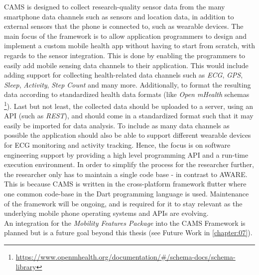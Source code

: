 CAMS is designed to collect research-quality sensor data from the many smartphone data channels such as sensors and location data, in addition to external sensors that the phone is connected to, such as wearable devices. The main focus of the framework is to allow application programmers to design and implement a custom mobile health app without having to start from scratch, with regards to the sensor integration. This is done by enabling the programmers to easily add mobile sensing data channels to their application. This would include adding support for collecting health-related data channels such as \textit{ECG}, \textit{GPS}, \textit{Sleep}, \textit{Activity}, \textit{Step Count} and many more. Additionally, to format the resulting data according to standardized health data formats (like \textit{Open mHealth} schemas \footnote{\url{https://www.openmhealth.org/documentation/#/schema-docs/schema-library}}). Last but not least, the collected data should be uploaded to a server, using an API (such as \textit{REST}), and should come in a standardized format such that it may easily be imported for data analysis. To include as many data channels as possible the application should also be able to support different wearable devices for ECG monitoring and activity tracking. Hence, the focus is on software engineering support by providing a high level programming API and a run-time execution environment. In order to simplify the process for the researcher further, the researcher only has to maintain a single code base - in contrast to AWARE. This is because CAMS  is written in the cross-platform framework flutter where one common code-base in the Dart programming language is used. Maintenance of the framework will be ongoing, and is required for it to stay relevant as the underlying mobile phone operating systems and APIs are evolving. \\

An integration for the \textit{Mobility Features Package} into the CAMS Framework is planned but is a future goal beyond this thesis (see Future Work in \ref{chapter:07}).